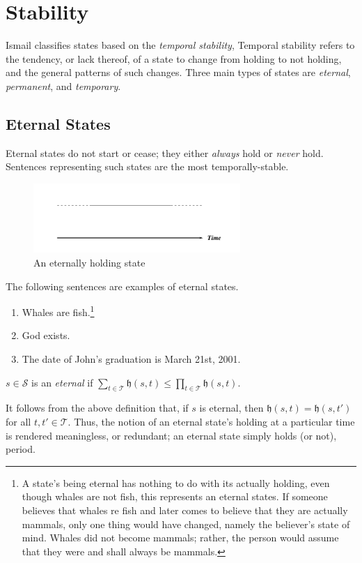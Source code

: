 \section{Stability}
Ismail \cite{ismail2013stability} classifies states based on the \textit{temporal stability}, Temporal stability refers to the tendency, or
lack thereof, of a state to change from holding to not holding, and the general patterns of such changes.
Three main types of states are \textit{eternal}, \textit{permanent}, and \textit{temporary}.

\subsection{Eternal States}
Eternal states do not start or cease; they either \textit{always} hold or \textit{never} hold. Sentences representing
such states are the most temporally-stable.
\begin{figure}[H]
  \centering
  \includegraphics[width=0.7\textwidth]{images/eternal-states.png}
  \caption{An eternally holding state}
  \label{fig:eternal}
\end{figure}

The following sentences are examples of eternal states.

\begin{enumerate}
  \item Whales are fish.\footnote{A state’s being eternal has nothing to do with its actually holding, even though whales are not fish,
          this represents an eternal states. If someone believes that whales re fish and later comes to believe that they are actually mammals, only one thing would have
          changed, namely the believer’s state of mind. Whales did not become mammals; rather, the person
          would assume that they were and shall always be mammals.\cite{ismail2001reasoning}}
  \item God exists.
  \item The date of John’s graduation is March 21st, 2001.
\end{enumerate}

\begin{defn}
  $s \in \mathcal{S}$ is an \textit{eternal} if $\displaystyle \sum_{t \in \mathcal{T}} \mathfrak{h}(s, t) \leq \prod_{t \in \mathcal{T}} \mathfrak{h}(s, t)$.
\end{defn}
It follows from the above definition that, if $s$ is eternal, then $\mathfrak{h}(s, t) = \mathfrak{h}(s, t')$ for all $t, t' \in \mathcal{T}$.
Thus, the notion of an eternal state’s holding at a particular time is rendered
meaningless, or redundant; an eternal state simply holds (or not), period.

